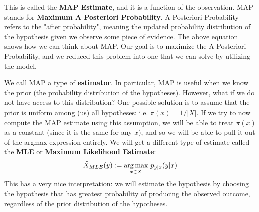 This is called the \textbf{MAP Estimate}, and it is a function of the observation. MAP stands for \textbf{Maximum A Posteriori Probability}. A Posteriori Probability refers to the "after probability", meaning the 
updated probability distribution of the hypothesis given we observe some piece of evidence. The above equation shows how we can think about MAP. Our goal is to maximize the A Posteriori Probability, and we reduced this problem into one that we can solve by utilizing the model. \newline 

We call MAP a type of \textbf{estimator}. In particular, MAP is useful when we know the prior (the probability distribution of the hypotheses). However, what if we do not have access to this distribution? One possible solution is to assume that the prior is uniform among (us) all hypotheses: i.e. \(\pi(x) = 1/|X|\). If we try to now compute the MAP estimate using this assumption, we will be able to treat \(\pi(x)\) as a constant (since it is the same for any \(x\)), and so we will be able to pull it out of the argmax expression entirely. We will get a different type of estimate called the \textbf{MLE} or \textbf{Maximum Likelihood Estimate}:
\begin{equation*}
  \MLE (y) := \underset{x \in X}{\argmax}\ p_{y|x}(y|x)
\end{equation*}
This has a very nice interpretation: we will estimate the hypothesis by choosing the hypothesis that has greatest probability of producing the observed outcome, regardless of the prior distribution of the hypotheses.





